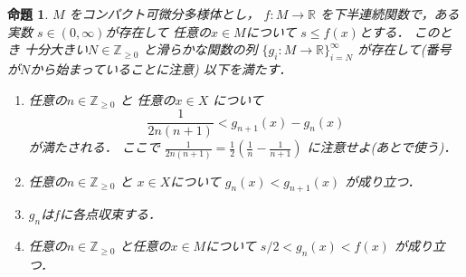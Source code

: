 \documentclass[leqno, a4paper, 12pt, dvipdfmx]{jsarticle}
\newtheorem{prop}[thm]{命題}
\newcommand{\zz}{\mathbb{Z}}
\newcommand{\rr}{\mathbb{R}}
\begin{document}
\begin{prop}\label{prop:kabibunn}
$M$
をコンパクト可微分多様体とし，
$f\colon M\to \rr$
を下半連続関数で，ある実数
$s\in (0, \infty)$が存在して
任意の$x\in M$について
$s\le f(x)$とする．
このとき
十分大きい$N\in \zz_{\ge 0}$
と滑らかな関数の列
$\{g_{i}\colon M\to \rr\}_{i=N}^{\infty}$
が存在して(番号が$N$から始まっていることに注意)
以下を満たす．
\begin{enumerate}[label=\textup{(\arabic*)}]
\item 
任意の$n\in \zz_{\ge 0}$
と
任意の$x\in X$
について
\[
\frac{1}{2n(n+1)}<g_{n+1}(x)-g_{n}(x)
\]
が満たされる．
ここで
$\frac{1}{2n(n+1)}=\frac{1}{2}(\frac{1}{n}-\frac{1}{n+1})$
に注意せよ(あとで使う)．

\item 
任意の$n\in \zz_{\ge 0}$
と
$x\in X$について
$g_{n}(x)< g_{n+1}(x)$
が成り立つ．

\item 
$g_{n}$は$f$に各点収束する．

\item 
任意の$n\in\zz_{\ge 0}$
と任意の$x\in M$について
$s/2<g_{n}(x)< f(x)$
が成り立つ．
\end{enumerate}
\end{prop}
\end{document}
